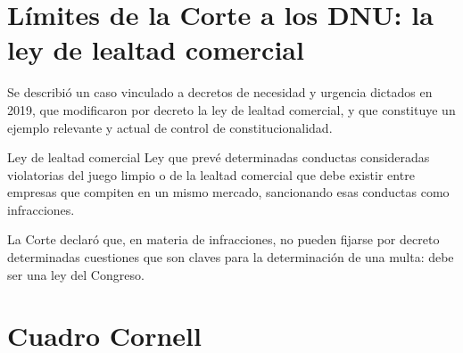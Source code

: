 \documentclass[12pt,oneside]{book}
\begin{document}
\section{Límites de la Corte a los DNU: la ley de lealtad comercial}

Se describió un caso vinculado a decretos de necesidad y urgencia dictados en 2019, que modificaron por decreto la ley de lealtad comercial, y que constituye un ejemplo relevante y actual de control de constitucionalidad.

\begin{definition}{Ley de lealtad comercial}
Ley que prevé determinadas conductas consideradas violatorias del juego limpio o de la lealtad comercial que debe existir entre empresas que compiten en un mismo mercado, sancionando esas conductas como infracciones.
\end{definition}

La Corte declaró que, en materia de infracciones, no pueden fijarse por decreto determinadas cuestiones que son claves para la determinación de una multa: debe ser una ley del Congreso.

\clearpage
\section{Cuadro Cornell}
\end{document}
